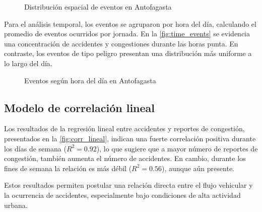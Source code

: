 \documentclass[12pt]{article}
\begin{document}
\begin{figure}[H]
    \centering
    \caption{Distribución espacial de eventos en Antofagasta}
    \label{fig:dist_events}
\end{figure}

Para el análisis temporal, los eventos se agruparon por hora del día, calculando el promedio de eventos ocurridos por jornada. En la \autoref{fig:time_events} se evidencia una concentración de accidentes y congestiones durante las horas punta. En contraste, los eventos de tipo peligro presentan una distribución más uniforme a lo largo del día.

\begin{figure}[H]
    \centering
    \newline
    \newline
    \newline
    \caption{Eventos según hora del día en Antofagasta}
    \label{fig:time_events}
\end{figure}

\subsection{Modelo de correlación lineal}

Los resultados de la regresión lineal entre accidentes y reportes de congestión, presentados en la \autoref{fig:corr_lineal}, indican una fuerte correlación positiva durante los días de semana ($R^2 = 0.92$), lo que sugiere que a mayor número de reportes de congestión, también aumenta el número de accidentes. En cambio, durante los fines de semana la relación es más débil ($R^2 = 0.56$), aunque aún presente.

Estos resultados permiten postular una relación directa entre el flujo vehicular y la ocurrencia de accidentes, especialmente bajo condiciones de alta actividad urbana.

\end{document}
